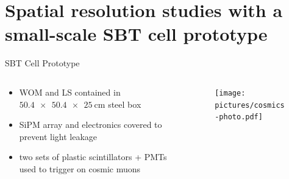 \documentclass[aspectratio=169]{beamer}
\begin{document}
	
	
	\section[Spatial resolution]{Spatial resolution studies with a small-scale SBT cell prototype}
	
	
	\begin{frame}{SBT Cell Prototype}
		\begin{columns}
			
			\begin{column}{0.5\textwidth}
				\begin{itemize}
					\item WOM and LS contained in $\SI{50.4 x 50.4 x 25}{\centi\meter}$ steel box
					\item SiPM array and electronics covered to prevent light leakage
					\item two sets of plastic scintillators + PMTs used to trigger on cosmic muons
				\end{itemize}
			\end{column}
		
			\begin{column}{0.5\textwidth}
					\begin{figure}
						\centering
						\texttt{[image: pictures/cosmics-photo.pdf]}
					\end{figure}
			\end{column}
			
			
			
			
			
		\end{columns}
	\end{frame}
\end{document}
